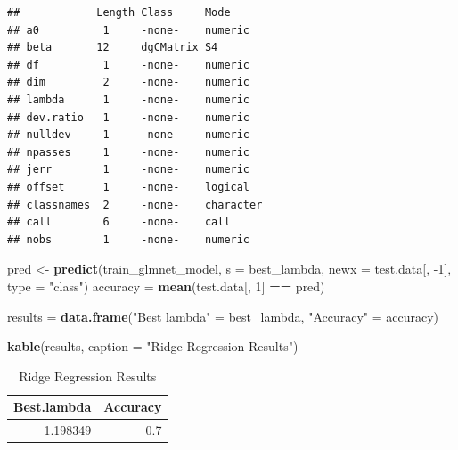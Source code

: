 \documentclass[]{article}
\newenvironment{Shaded}{\begin{snugshade}}{\end{snugshade}}
\newcommand{\CommentTok}[1]{\textcolor[rgb]{0.56,0.35,0.01}{\textit{#1}}}
\newcommand{\DataTypeTok}[1]{\textcolor[rgb]{0.13,0.29,0.53}{#1}}
\newcommand{\DecValTok}[1]{\textcolor[rgb]{0.00,0.00,0.81}{#1}}
\newcommand{\FloatTok}[1]{\textcolor[rgb]{0.00,0.00,0.81}{#1}}
\newcommand{\KeywordTok}[1]{\textcolor[rgb]{0.13,0.29,0.53}{\textbf{#1}}}
\newcommand{\NormalTok}[1]{#1}
\newcommand{\OperatorTok}[1]{\textcolor[rgb]{0.81,0.36,0.00}{\textbf{#1}}}
\newcommand{\StringTok}[1]{\textcolor[rgb]{0.31,0.60,0.02}{#1}}
\begin{document}
\begin{Shaded}
\end{Shaded}

\begin{verbatim}
##            Length Class     Mode     
## a0          1     -none-    numeric  
## beta       12     dgCMatrix S4       
## df          1     -none-    numeric  
## dim         2     -none-    numeric  
## lambda      1     -none-    numeric  
## dev.ratio   1     -none-    numeric  
## nulldev     1     -none-    numeric  
## npasses     1     -none-    numeric  
## jerr        1     -none-    numeric  
## offset      1     -none-    logical  
## classnames  2     -none-    character
## call        6     -none-    call     
## nobs        1     -none-    numeric
\end{verbatim}

\begin{Shaded}
\begin{Highlighting}[]
\NormalTok{  pred <-}\StringTok{ }\KeywordTok{predict}\NormalTok{(train_glmnet_model, }\DataTypeTok{s =}\NormalTok{ best_lambda, }\DataTypeTok{newx =}\NormalTok{ test.data[, }\DecValTok{-1}\NormalTok{], }\DataTypeTok{type =} \StringTok{"class"}\NormalTok{)}
\NormalTok{  accuracy =}\StringTok{ }\KeywordTok{mean}\NormalTok{(test.data[, }\DecValTok{1}\NormalTok{] }\OperatorTok{==}\StringTok{ }\NormalTok{pred)}
  
\NormalTok{  results =}\StringTok{ }\KeywordTok{data.frame}\NormalTok{(}\StringTok{"Best lambda"}\NormalTok{ =}\StringTok{ }\NormalTok{best_lambda, }\StringTok{"Accuracy"}\NormalTok{ =}\StringTok{ }\NormalTok{accuracy)}
\end{Highlighting}
\end{Shaded}

\begin{Shaded}
\begin{Highlighting}[]
  \KeywordTok{kable}\NormalTok{(results, }\DataTypeTok{caption =} \StringTok{"Ridge Regression Results"}\NormalTok{)}
\end{Highlighting}
\end{Shaded}

\begin{table}

\caption{\label{tab:unnamed-chunk-37}Ridge Regression Results}
\centering
\begin{tabular}[t]{r|r}
\hline
Best.lambda & Accuracy\\
\hline
1.198349 & 0.7\\
\hline
\end{tabular}
\end{table}
\end{document}
